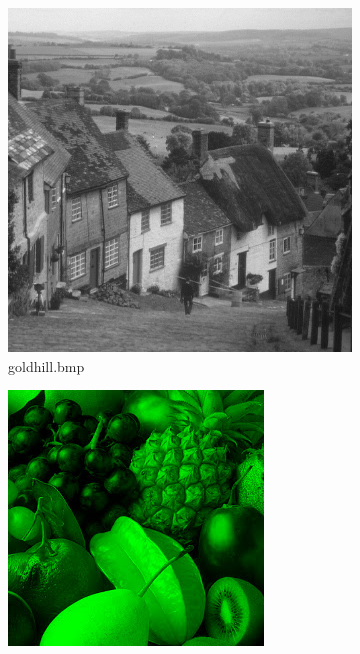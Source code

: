 \documentclass{l4proj}
\begin{document}
\begin{appendices}
\begin{figure}[!h]
\begin{subfigure}[b]{0.3\textwidth}
        \includegraphics[width=\textwidth]{images/goldhill.png}
        \caption{goldhill.bmp}
        \label{goldhill.bmp}
    \end{subfigure}
    \begin{subfigure}[b]{0.3\textwidth}
        \includegraphics[width=\textwidth]{images/green.png}

\end{subfigure}
\end{figure}
\end{appendices}
\end{document}
